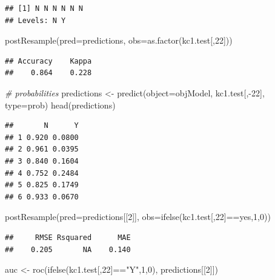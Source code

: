 \documentclass[
]{book}
\newenvironment{Shaded}{\begin{snugshade}}{\end{snugshade}}
\newcommand{\AttributeTok}[1]{\textcolor[rgb]{0.77,0.63,0.00}{#1}}
\newcommand{\CommentTok}[1]{\textcolor[rgb]{0.56,0.35,0.01}{\textit{#1}}}
\newcommand{\DecValTok}[1]{\textcolor[rgb]{0.00,0.00,0.81}{#1}}
\newcommand{\FunctionTok}[1]{\textcolor[rgb]{0.00,0.00,0.00}{#1}}
\newcommand{\NormalTok}[1]{#1}
\newcommand{\OtherTok}[1]{\textcolor[rgb]{0.56,0.35,0.01}{#1}}
\newcommand{\SpecialCharTok}[1]{\textcolor[rgb]{0.00,0.00,0.00}{#1}}
\newcommand{\StringTok}[1]{\textcolor[rgb]{0.31,0.60,0.02}{#1}}
\begin{document}
\begin{verbatim}
## [1] N N N N N N
## Levels: N Y
\end{verbatim}

\begin{Shaded}
\begin{Highlighting}[]
\FunctionTok{postResample}\NormalTok{(}\AttributeTok{pred=}\NormalTok{predictions, }\AttributeTok{obs=}\FunctionTok{as.factor}\NormalTok{(kc1.test[,}\DecValTok{22}\NormalTok{]))}
\end{Highlighting}
\end{Shaded}

\begin{verbatim}
## Accuracy    Kappa 
##    0.864    0.228
\end{verbatim}

\begin{Shaded}
\begin{Highlighting}[]
\CommentTok{\# probabilities }
\NormalTok{predictions }\OtherTok{\textless{}{-}} \FunctionTok{predict}\NormalTok{(}\AttributeTok{object=}\NormalTok{objModel, kc1.test[,}\SpecialCharTok{{-}}\DecValTok{22}\NormalTok{], }\AttributeTok{type=}\StringTok{\textquotesingle{}prob\textquotesingle{}}\NormalTok{)}
\FunctionTok{head}\NormalTok{(predictions)}
\end{Highlighting}
\end{Shaded}

\begin{verbatim}
##       N      Y
## 1 0.920 0.0800
## 2 0.961 0.0395
## 3 0.840 0.1604
## 4 0.752 0.2484
## 5 0.825 0.1749
## 6 0.933 0.0670
\end{verbatim}

\begin{Shaded}
\begin{Highlighting}[]
\FunctionTok{postResample}\NormalTok{(}\AttributeTok{pred=}\NormalTok{predictions[[}\DecValTok{2}\NormalTok{]], }\AttributeTok{obs=}\FunctionTok{ifelse}\NormalTok{(kc1.test[,}\DecValTok{22}\NormalTok{]}\SpecialCharTok{==}\StringTok{\textquotesingle{}yes\textquotesingle{}}\NormalTok{,}\DecValTok{1}\NormalTok{,}\DecValTok{0}\NormalTok{))}
\end{Highlighting}
\end{Shaded}

\begin{verbatim}
##     RMSE Rsquared      MAE 
##    0.205       NA    0.140
\end{verbatim}

\begin{Shaded}
\begin{Highlighting}[]
\NormalTok{auc }\OtherTok{\textless{}{-}} \FunctionTok{roc}\NormalTok{(}\FunctionTok{ifelse}\NormalTok{(kc1.test[,}\DecValTok{22}\NormalTok{]}\SpecialCharTok{==}\StringTok{"Y"}\NormalTok{,}\DecValTok{1}\NormalTok{,}\DecValTok{0}\NormalTok{), predictions[[}\DecValTok{2}\NormalTok{]])}
\end{Highlighting}
\end{Shaded}
\end{document}
